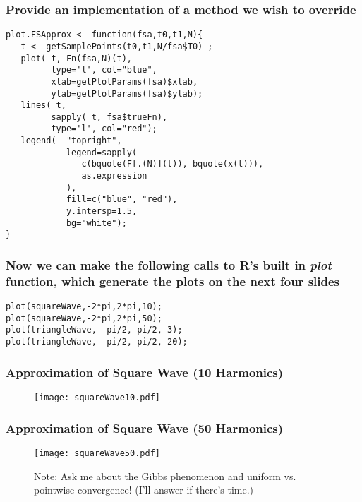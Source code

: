 \documentclass{beamer}
\begin{document}
\begin{frame}[fragile]
   \frametitle{Provide an implementation of a method we wish to override}
   \begin{center}
   \begin{minipage}{100mm}
   \begin{lstlisting}
plot.FSApprox <- function(fsa,t0,t1,N){
   t <- getSamplePoints(t0,t1,N/fsa$T0) ;
   plot( t, Fn(fsa,N)(t), 
         type='l', col="blue", 
         xlab=getPlotParams(fsa)$xlab, 
         ylab=getPlotParams(fsa)$ylab);
   lines( t, 
         sapply( t, fsa$trueFn),
         type='l', col="red");
   legend(  "topright", 
            legend=sapply(
               c(bquote(F[.(N)](t)), bquote(x(t))),
               as.expression
            ), 
            fill=c("blue", "red"),
            y.intersp=1.5,
            bg="white");
}
   \end{lstlisting}
   \end{minipage}
   \end{center}
\end{frame}

\begin{frame}[fragile]
   \frametitle{Now we can make the following calls to R's built in \emph{plot} function, which generate the plots on the next four slides}
   \begin{center}
   \begin{minipage}{100mm}
   \begin{lstlisting}
plot(squareWave,-2*pi,2*pi,10);
plot(squareWave,-2*pi,2*pi,50);
plot(triangleWave, -pi/2, pi/2, 3);
plot(triangleWave, -pi/2, pi/2, 20);
   \end{lstlisting}
   \end{minipage}
   \end{center}
\end{frame}

\begin{frame}[fragile]
   \frametitle{Approximation of Square Wave (10 Harmonics)}
   \begin{figure}
   \texttt{[image: squareWave10.pdf]}
   \end{figure}
\end{frame}

\begin{frame}[fragile]
   \frametitle{Approximation of Square Wave (50 Harmonics)}
   \begin{figure}
      \caption{Note: Ask me about the Gibbs phenomenon and uniform vs. pointwise convergence! (I'll answer if there's time.)}
      \texttt{[image: squareWave50.pdf]}
   \end{figure}
\end{frame}
\end{document}
